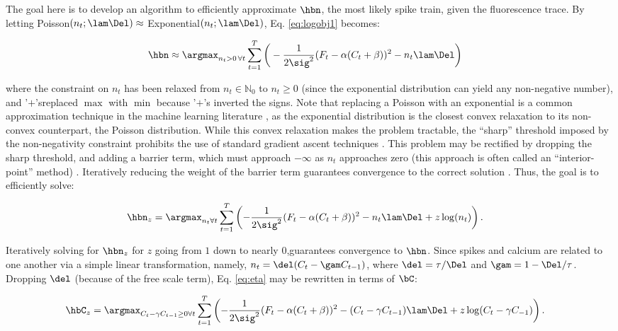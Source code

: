 The goal here is to develop an algorithm to efficiently approximate $\hbn$, the most likely spike train, given the fluorescence trace. By letting Poisson$(n_t; \lam\Del) \approx$ Exponential$(n_t; \lam\Del)$, Eq. \eqref{eq:logobj1} becomes:

\begin{align} \label{eq:obj2}
\hbn &\approx \argmax_{n_t>0 \, \forall t}  \sum_{t=1}^T \bigg( -\frac{1}{2 \sig^2}(F_t - \alpha(C_t + \beta))^2  - n_t \lam \Del \bigg) 
\end{align}

\noindent where the constraint on $n_t$ has been relaxed from  $n_t \in \mathbb{N}_0$ to $n_t \geq 0$ (since the exponential distribution can yield any non-negative number), and '$+$'sreplaced $\max$ with $\min$ because '$+$'s inverted the signs.  Note that replacing a Poisson with an exponential is a common approximation technique in the machine learning literature \cite{PaninskiWu09}, as the exponential distribution is the closest convex relaxation to its non-convex counterpart, the Poisson distribution. While this convex relaxation makes the problem tractable, the ``sharp'' threshold imposed by the non-negativity constraint prohibits the use of standard gradient ascent techniques \cite{CONV04}. This problem may be rectified by dropping the sharp threshold, and adding a barrier term, which must approach $-\infty$ as $n_t$ approaches zero (this approach is often called an ``interior-point'' method) \cite{CONV04}. Iteratively reducing the weight of the barrier term guarantees convergence to the correct solution \cite{CONV04}.  Thus, the goal is to efficiently solve:

\begin{align} \label{eq:eta}
\hbn_{\zzz} &= \argmax_{n_t \forall t}  \sum_{t=1}^T \left( -\frac{1}{2 \sig^2}(F_t - \alpha(C_t + \beta))^2  -  n_t  \lam \Del + \zzz \log(n_t) \right).
\end{align}

\noindent Iteratively solving for $\hbn_{\zzz}$ for $z$ going from $1$ down to nearly $0$,guarantees convergence to $\hbn$. Since spikes and calcium are related to one another via a simple linear transformation, namely, $n_t= \del (C_t-\gam C_{t-1})$, where $\del=\tau/\Del$ and $\gam=1-\Del/\tau$.  Dropping $\del$ (because of the free scale term), Eq. \eqref{eq:eta} may be rewritten in terms of $\bC$:

\begin{align} 
\hbC_{\zzz} &= \argmax_{C_t - \gamma C_{t-1} \geq 0 \forall t} \sum_{t=1}^{T} \left( -\frac{1}{2 \sig^2} (F_t -\alpha (C_t + \beta))^2  - (C_t - \gamma C_{t-1}) \lam \Del + \zzz \log(C_t - \gamma C_{-1}) \right). \label{eq:eta2}
\end{align}

